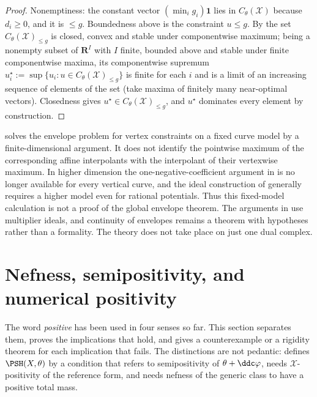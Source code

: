 \begin{proof}
Nonemptiness: the constant vector $(\min_ig_i)\mathbf 1$ lies in
$C_\theta(\mathcal X)$ because $d_i\geq0$, and it is $\leq g$.
Boundedness above is the constraint $u\leq g$.  By
 the set $C_\theta(\mathcal X)_{\le g}$ is
closed, convex and stable under componentwise maximum; being a nonempty
subset of $\mathbf R^I$ with $I$ finite, bounded above and stable under
finite componentwise maxima, its componentwise supremum
$u^\star_i:=\sup\{u_i:u\in C_\theta(\mathcal X)_{\le g}\}$ is finite for
each $i$ and is a limit of an increasing sequence of elements of the set
(take maxima of finitely many near-optimal vectors).  Closedness gives
$u^\star\in C_\theta(\mathcal X)_{\le g}$, and $u^\star$ dominates every
element by construction.
\end{proof}

\begin{remark}
\label{rem:ch20-fixed-model-envelope-scope}
 solves the envelope problem for vertex
constraints on a fixed curve model by a finite-dimensional argument.  It
does not identify the pointwise maximum of the corresponding affine
interpolants with the interpolant of their vertexwise maximum.  In higher
dimension the one-negative-coefficient argument in
 is no longer available for every vertical
curve, and the ideal construction of  generally
requires a higher model even for rational potentials.  Thus this fixed-model
calculation is not a proof of the global envelope theorem.  The arguments in
 use multiplier ideals, and continuity of envelopes
remains a theorem with hypotheses rather than a formality.  The theory does
not take place on just one dual complex.
\end{remark}

\section{Nefness, semipositivity, and numerical positivity}
\label{sec:ch20-positivity}

The word \emph{positive} has been used in four senses so far.  This section
separates them, proves the implications that hold, and gives a
counterexample or a rigidity theorem for each implication that fails.  The
distinctions are not pedantic:  defines
$\PSH(X,\theta)$ by a condition that refers to semipositivity of
$\theta+\ddc\varphi$,  needs
$\mathcal X$-positivity of the reference form, and
 needs nefness of the generic class to have a positive
total mass.

